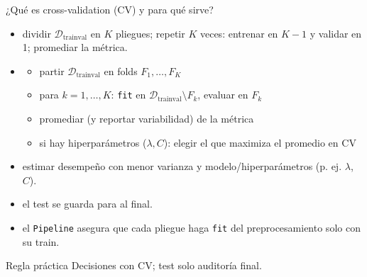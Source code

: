 \begin{frame}{¿Qué es cross-validation (CV) y para qué sirve?}

\footnotesize
\begin{itemize}\setlength{\itemsep}{0.35em}
  \item {} dividir \(\mathcal{D}_{\text{trainval}}\) en \(K\) pliegues; repetir \(K\) veces:
  entrenar en \(K-1\) y validar en 1; promediar la métrica.
  \item {}
  \begin{itemize}\setlength{\itemsep}{0.2em}
    \item partir \(\mathcal{D}_{\text{trainval}}\) en folds \(F_1,\dots,F_K\)
    \item para \(k=1,\dots,K\): \texttt{fit} en \(\mathcal{D}_{\text{trainval}}\setminus F_k\), evaluar en \(F_k\)
    \item promediar (y reportar variabilidad) de la métrica
    \item si hay hiperparámetros (\(\lambda, C\)): elegir el que maximiza el promedio en CV
  \end{itemize}
  \item {} estimar desempeño con menor varianza y  modelo/hiperparámetros (p. ej. \(\lambda\), \(C\)).
  \item {} el test se guarda para  al final.
  \item {} el \texttt{Pipeline} asegura que cada pliegue haga \texttt{fit} del preprocesamiento solo con su train.
\end{itemize}

\begin{block}{Regla práctica}
Decisiones con CV; test solo auditoría final.
\end{block}
\end{frame}

